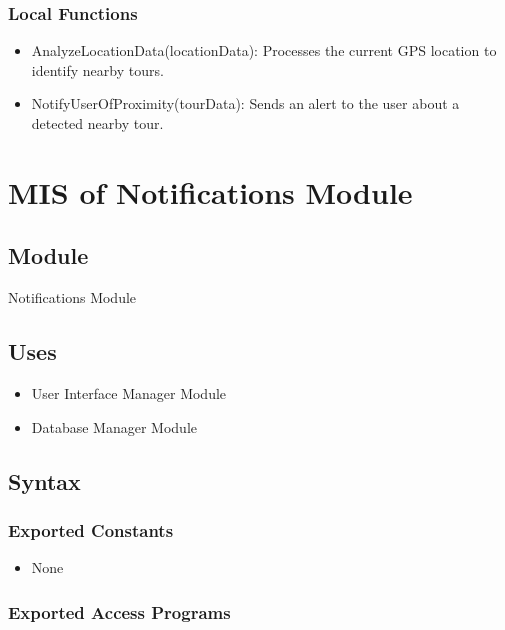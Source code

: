\documentclass[12pt, titlepage]{article}
\begin{document}
\subsubsection{Local Functions}

\begin{itemize}
  \item AnalyzeLocationData(locationData): Processes the current GPS location to identify nearby tours.
  \item NotifyUserOfProximity(tourData): Sends an alert to the user about a detected nearby tour.
\end{itemize}

\newpage

\section{MIS of Notifications Module} \label{Module_Notifications}

\subsection{Module}

Notifications Module

\subsection{Uses}

\begin{itemize}
  \item User Interface Manager Module
  \item Database Manager Module
\end{itemize}

\subsection{Syntax}

\subsubsection{Exported Constants}

\begin{itemize}
  \item None
\end{itemize}

\subsubsection{Exported Access Programs}
\end{document}
